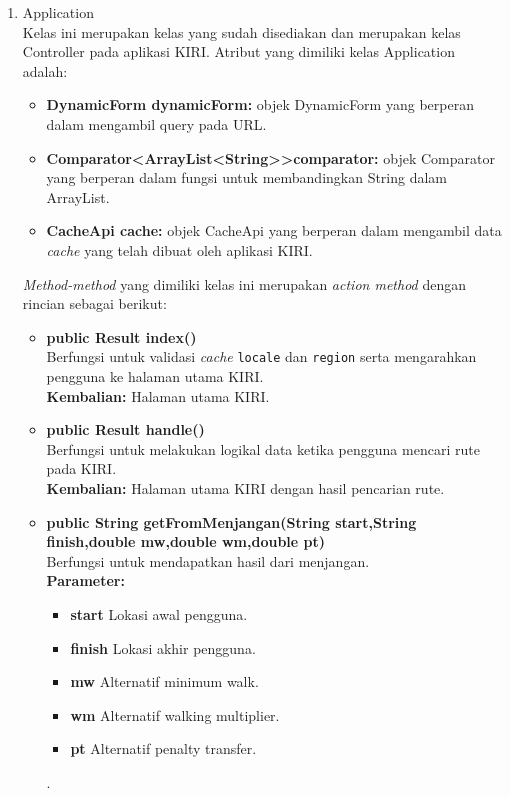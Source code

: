 \begin{enumerate}
	\item Application\\
	Kelas ini merupakan kelas yang sudah disediakan \play dan merupakan kelas Controller pada aplikasi KIRI. Atribut yang dimiliki kelas Application adalah:
	\begin{itemize}
		\item \textbf{DynamicForm dynamicForm:} objek DynamicForm yang berperan dalam mengambil query pada URL. 
		\item \textbf{Comparator<ArrayList<String\textgreater \textgreater comparator:} objek Comparator yang berperan dalam fungsi untuk membandingkan String dalam ArrayList.
		\item \textbf{CacheApi cache:} objek CacheApi yang berperan dalam mengambil data \textit{cache} yang telah dibuat oleh aplikasi KIRI.
		
	\end{itemize}
	\textit{Method-method} yang dimiliki kelas ini merupakan \textit{action method} dengan rincian sebagai berikut:
	\begin{itemize}
		\item \textbf{public Result index()}\\
		Berfungsi untuk validasi \textit{cache} \verb!locale! dan \verb!region! serta mengarahkan pengguna ke halaman utama KIRI.\\
		\textbf{Kembalian:}  Halaman utama KIRI.
		
		\item \textbf{public Result handle()}\\
		Berfungsi untuk melakukan logikal data ketika pengguna mencari rute pada KIRI.\\
		\textbf{Kembalian:}  Halaman utama KIRI dengan hasil pencarian rute.
		
		\item \textbf{public String getFromMenjangan(String start,String finish,double mw,double wm,double pt)}\\
		Berfungsi untuk mendapatkan hasil dari menjangan.\\
		\textbf{Parameter:}
				\begin{itemize}
					\item \textbf{start} Lokasi awal pengguna.
					\item \textbf{finish} Lokasi akhir pengguna.
					\item \textbf{mw} Alternatif minimum walk.
					\item \textbf{wm} Alternatif walking multiplier.
					\item \textbf{pt} Alternatif penalty transfer.
				\end{itemize}.
				

\end{itemize}
\end{enumerate}
